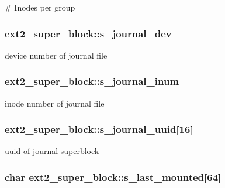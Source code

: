 \# \-Inodes per group \hypertarget{structext2__super__block_a5c65ec434f4b1394d6ec68fb8d055a4e}{
\subsubsection[{s\-\_\-journal\-\_\-dev}]{ {\bf ext2\-\_\-super\-\_\-block\-::s\-\_\-journal\-\_\-dev}}}\label{structext2__super__block_a5c65ec434f4b1394d6ec68fb8d055a4e}
device number of journal file \hypertarget{structext2__super__block_a593535b5ffb1b5480f887e0aae0be698}{
\subsubsection[{s\-\_\-journal\-\_\-inum}]{ {\bf ext2\-\_\-super\-\_\-block\-::s\-\_\-journal\-\_\-inum}}}\label{structext2__super__block_a593535b5ffb1b5480f887e0aae0be698}
inode number of journal file \hypertarget{structext2__super__block_a31f78875053afe2073c72ab700e831cd}{
\subsubsection[{s\-\_\-journal\-\_\-uuid}]{ {\bf ext2\-\_\-super\-\_\-block\-::s\-\_\-journal\-\_\-uuid}\mbox{[}16\mbox{]}}}\label{structext2__super__block_a31f78875053afe2073c72ab700e831cd}
uuid of journal superblock \hypertarget{structext2__super__block_ad2849dfeab713d00ddd93c97eaf80cea}{
\subsubsection[{s\-\_\-last\-\_\-mounted}]{\setlength{\rightskip}{0pt plus 5cm}char {\bf ext2\-\_\-super\-\_\-block\-::s\-\_\-last\-\_\-mounted}\mbox{[}64\mbox{]}}}\label{structext2__super__block_ad2849dfeab713d00ddd93c97eaf80cea}
